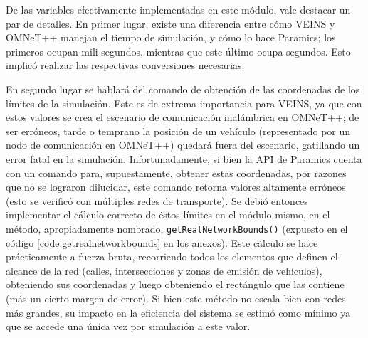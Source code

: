 De las variables efectivamente implementadas en este módulo, vale destacar un par de detalles. En primer lugar, existe una diferencia entre cómo VEINS y OMNeT++ manejan el tiempo de simulación, y cómo lo hace Paramics; los primeros ocupan mili-segundos, mientras que este último ocupa segundos. Esto implicó realizar las respectivas conversiones necesarias.

En segundo lugar se hablará del comando de obtención de las coordenadas de los límites de la simulación. Este es de extrema importancia para VEINS, ya que con estos valores se crea el escenario de comunicación inalámbrica en OMNeT++; de ser erróneos, tarde o temprano la posición de un vehículo (representado por un nodo de comunicación en OMNeT++) quedará fuera del escenario, gatillando un error fatal en la simulación. 
Infortunadamente, si bien la API de Paramics cuenta con un comando para, supuestamente, obtener estas coordenadas, por razones que no se lograron dilucidar, este comando retorna valores altamente erróneos (esto se verificó con múltiples redes de transporte).
Se debió entonces implementar el cálculo correcto de éstos límites en el módulo mismo, en el método, apropiadamente nombrado, \texttt{getRealNetworkBounds()} (expuesto en el código \ref{code:getrealnetworkbounds} en los anexos). Este cálculo se hace prácticamente a fuerza bruta, recorriendo todos los elementos que definen el alcance de la red (calles, intersecciones y zonas de emisión de vehículos), obteniendo sus coordenadas y luego obteniendo el rectángulo que las contiene (más un cierto margen de error).
Si bien este método no escala bien con redes más grandes, su impacto en la eficiencia del sistema se estimó como mínimo ya que se accede una única vez por simulación a este valor.